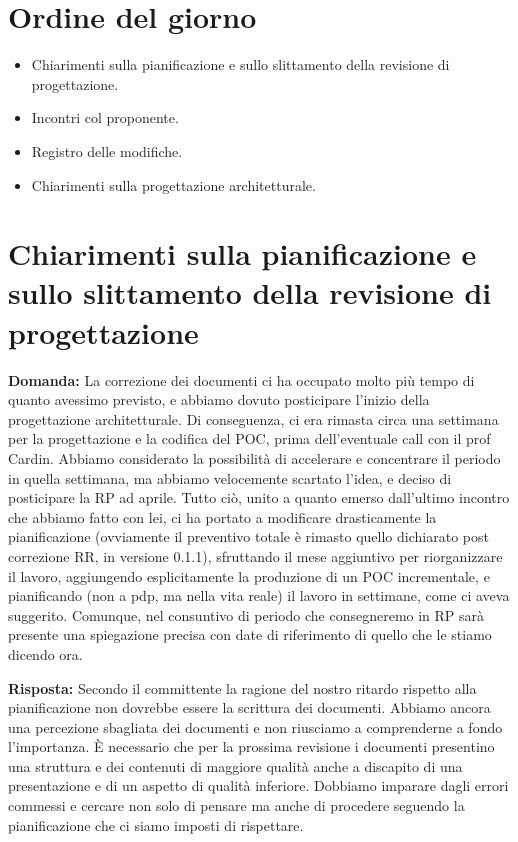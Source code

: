 \documentclass{article}
\begin{document}
\section{Ordine del giorno}%
\label{sec:ordine_del_giorno}

\begin{itemize}
  \item Chiarimenti sulla pianificazione e sullo slittamento della revisione di progettazione.
  \item Incontri col proponente.
  \item Registro delle modifiche.
  \item Chiarimenti sulla progettazione architetturale.
\end{itemize}

\section{Chiarimenti sulla pianificazione e sullo slittamento della revisione di progettazione}%
\label{sec:chiarimenti_sulla_pianificazione_e_sullo_slittamento_della_revisione_di_progettazione}

\textbf{Domanda:} La correzione dei documenti ci ha occupato molto più tempo di quanto avessimo previsto, e abbiamo dovuto posticipare l’inizio della progettazione architetturale.
Di conseguenza, ci era rimasta circa una settimana per la progettazione e la codifica del POC, prima dell’eventuale call con il prof Cardin. Abbiamo considerato la possibilità di accelerare e concentrare il periodo in quella settimana, ma abbiamo velocemente scartato l’idea, e deciso di posticipare la RP ad aprile.
Tutto ciò, unito a quanto emerso dall’ultimo incontro che abbiamo fatto con lei, ci ha portato a modificare drasticamente la pianificazione (ovviamente il preventivo totale è rimasto quello dichiarato post correzione RR, in versione 0.1.1), sfruttando il mese aggiuntivo per riorganizzare il lavoro, aggiungendo esplicitamente la produzione di un POC incrementale, e pianificando (non a pdp, ma nella vita reale) il lavoro in settimane, come ci aveva suggerito.
Comunque, nel consuntivo di periodo che consegneremo in RP sarà presente una spiegazione precisa con date di riferimento di quello che le stiamo dicendo ora.

\textbf{Risposta:} Secondo il committente la ragione del nostro ritardo rispetto alla pianificazione non dovrebbe essere la scrittura dei documenti.
Abbiamo ancora una percezione sbagliata dei documenti e non riusciamo a comprenderne a fondo l'importanza.
È necessario che per la prossima revisione i documenti presentino una struttura e dei contenuti di maggiore qualità anche a discapito di una presentazione e di un aspetto di qualità inferiore.
Dobbiamo imparare dagli errori commessi e cercare non solo di pensare ma anche di procedere seguendo la pianificazione che ci siamo imposti di rispettare.\\
\end{document}
